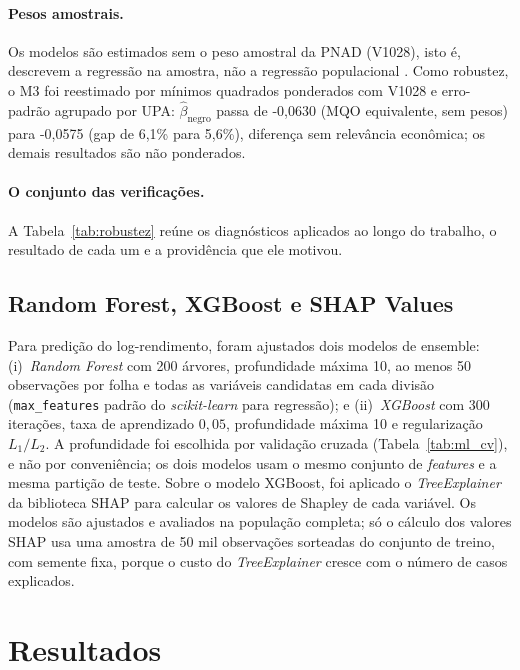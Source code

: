 \documentclass[12pt, a4paper, oneside]{article}
\let\oldsubsectionFB\subsection
\renewcommand{\subsection}{\FloatBarrier\oldsubsectionFB}
\begin{document}
\paragraph{Pesos amostrais.} Os modelos são estimados sem o peso amostral da PNAD (V1028), isto é, descrevem a regressão na amostra, não a regressão populacional \cite{angrist2009}. Como robustez, o M3 foi reestimado por mínimos quadrados ponderados com V1028 e erro-padrão agrupado por UPA: $\hat\beta_{\text{negro}}$ passa de -0,0630 (MQO equivalente, sem pesos) para -0,0575 (gap de 6,1\% para 5,6\%), diferença sem relevância econômica; os demais resultados são não ponderados. 

\paragraph{O conjunto das verificações.} A Tabela~\ref{tab:robustez} reúne os diagnósticos aplicados ao longo do trabalho, o resultado de cada um e a providência que ele motivou.



\subsection{Random Forest, XGBoost e SHAP Values}

Para predição do log-rendimento, foram ajustados dois modelos de ensemble:
(i)~\textit{Random Forest} \cite{breiman2001} com 200 árvores, profundidade
máxima 10, ao menos 50 observações por folha e todas as variáveis candidatas em cada
divisão (\texttt{max\_features} padrão do \textit{scikit-learn} para regressão); e (ii)~\textit{XGBoost} \cite{chen2016} com 300 iterações, taxa de aprendizado
$0{,}05$, profundidade máxima 10 e regularização $L_1/L_2$. A profundidade
foi escolhida por validação cruzada (Tabela~\ref{tab:ml_cv}), e não por conveniência;
os dois modelos usam o mesmo conjunto de \emph{features} e a mesma partição de teste. Sobre o modelo XGBoost,
foi aplicado o \textit{TreeExplainer} da biblioteca SHAP
\cite{lundberg2017} para calcular os valores de Shapley de cada variável. Os modelos são
ajustados e avaliados na população completa; só o cálculo dos valores SHAP usa uma amostra
de 50 mil observações sorteadas do conjunto de treino, com semente fixa, porque o custo do
\textit{TreeExplainer} cresce com o número de casos explicados.

\section{Resultados}
\label{sec:resultados}
\end{document}
